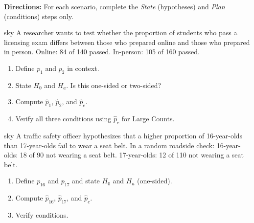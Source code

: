 \documentclass[10pt]{article}
\begin{document}
\namepartnerperiod

\vspace{0.15in}

\textbf{Directions:} For each scenario, complete the \textit{State} (hypotheses) and
\textit{Plan} (conditions) steps only.

\begin{scenariobox}{sky}
A researcher wants to test whether the proportion of students who pass a licensing exam
differs between those who prepared online and those who prepared in person.
Online: 84 of 140 passed. In-person: 105 of 160 passed.

\begin{enumerate}[label=\arabic*.]
  \item Define $p_1$ and $p_2$ in context. \writeline

  \item State $H_0$ and $H_a$. Is this one-sided or two-sided? 

  \item Compute $\hat p_1$, $\hat p_2$, and $\hat p_c$. 

  \item Verify all three conditions using $\hat p_c$ for Large Counts.
\end{enumerate}
\end{scenariobox}

\begin{scenariobox}{sky}
A traffic safety officer hypothesizes that a higher proportion of 16-year-olds than
17-year-olds fail to wear a seat belt. In a random roadside check:
16-year-olds: 18 of 90 not wearing a seat belt.
17-year-olds: 12 of 110 not wearing a seat belt.

\begin{enumerate}[label=\arabic*.]
  \item Define $p_{16}$ and $p_{17}$ and state $H_0$ and $H_a$ (one-sided). 

  \item Compute $\hat p_{16}$, $\hat p_{17}$, and $\hat p_c$. 

  \item Verify conditions. 
\end{enumerate}
\end{scenariobox}
\end{document}
